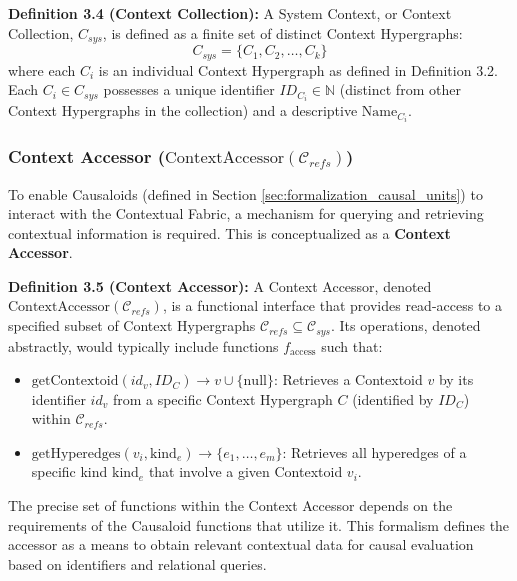     \noindent\textbf{Definition 3.4 (Context Collection):} A System Context, or Context Collection, \(C_{sys}\), is defined as a finite set of distinct Context Hypergraphs:  \[ C_{sys} = \{C_1, C_2, \dots, C_k\} \] where each \( C_i \) is an individual Context Hypergraph as defined in Definition 3.2. Each \(C_i \in C_{sys}\) possesses a unique identifier \(ID_{C_i} \in \mathbb{N}\) (distinct from other Context Hypergraphs in the collection) and a descriptive \(\text{Name}_{C_i}\).


    \subsubsection[Context Accessor (ContextAccessor C\_refs)]{Context Accessor (\(\text{ContextAccessor}(\mathcal{C}_{refs})\))}
    \label{ssec:context_accessor_formal}

    To enable Causaloids (defined in Section \ref{sec:formalization_causal_units}) to interact with the Contextual Fabric, a mechanism for querying and retrieving contextual information is required. This is conceptualized as a \textbf{Context Accessor}.

    \noindent\textbf{Definition 3.5 (Context Accessor):} A Context Accessor, denoted \(\text{ContextAccessor}(\mathcal{C}_{refs})\), is a functional interface that provides read-access to a specified subset of Context Hypergraphs \(\mathcal{C}_{refs} \subseteq \mathcal{C}_{sys}\).
    Its operations, denoted abstractly, would typically include functions \(f_{\text{access}}\) such that: %
    \begin{itemize} 
        \item \(\text{getContextoid}(id_v, ID_C) \to v \cup \{\text{null}\}\): Retrieves a Contextoid \(v\) by its identifier \(id_v\) from a specific Context Hypergraph \(C\) (identified by \(ID_C\)) within \(\mathcal{C}_{refs}\).
        \item \(\text{getHyperedges}(v_i, \text{kind}_e) \to \{e_1, \dots, e_m\}\): Retrieves all hyperedges of a specific kind \(\text{kind}_e\) that involve a given Contextoid \(v_i\).
    \end{itemize}
    The precise set of functions within the Context Accessor depends on the requirements of the Causaloid functions that utilize it. This formalism defines the accessor as a means to obtain relevant contextual data for causal evaluation based on identifiers and relational queries.

\clearpage

